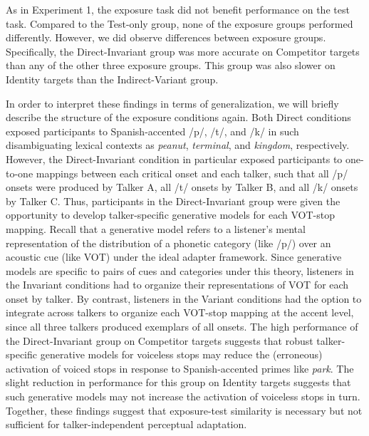 \documentclass[preprint, 3p, authoryear]{elsarticle} %
\begin{document}
As in Experiment 1, the exposure task did not benefit performance on the test task.
Compared to the Test-only group, none of the exposure groups performed differently.
However, we did observe differences between exposure groups.
Specifically, the Direct-Invariant group was more accurate on Competitor targets than any of the other three exposure groups.
This group was also slower on Identity targets than the Indirect-Variant group.

In order to interpret these findings in terms of generalization, we will briefly describe the structure of the exposure conditions again.
Both Direct conditions exposed participants to Spanish-accented /p/, /t/, and /k/ in such disambiguating lexical contexts as \emph{peanut}, \emph{terminal}, and \emph{kingdom}, respectively.
However, the Direct-Invariant condition in particular exposed participants to one-to-one mappings between each critical onset and each talker, such that all /p/ onsets were produced by Talker A, all /t/ onsets by Talker B, and all /k/ onsets by Talker C.
Thus, participants in the Direct-Invariant group were given the opportunity to develop talker-specific generative models for each VOT-stop mapping.
Recall that a generative model refers to a listener's mental representation of the distribution of a phonetic category (like /p/) over an acoustic cue (like VOT) under the ideal adapter framework.
Since generative models are specific to pairs of cues and categories under this theory, listeners in the Invariant conditions had to organize their representations of VOT for each onset by talker.
By contrast, listeners in the Variant conditions had the option to integrate across talkers to organize each VOT-stop mapping at the accent level, since all three talkers produced exemplars of all onsets.
The high performance of the Direct-Invariant group on Competitor targets suggests that robust talker-specific generative models for voiceless stops may reduce the (erroneous) activation of voiced stops in response to Spanish-accented primes like \emph{park}.
The slight reduction in performance for this group on Identity targets suggests that such generative models may not increase the activation of voiceless stops in turn.
Together, these findings suggest that exposure-test similarity is necessary but not sufficient for talker-independent perceptual adaptation.
\end{document}

